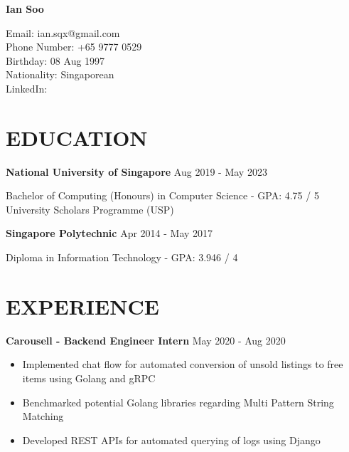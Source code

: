 \documentclass[11pt]{article} %
\begin{document}

{\LARGE\bfseries Ian Soo} %

Email: ian.sqx@gmail.com\\
Phone Number: +65 9777 0529\\
Birthday: 08 Aug 1997\\
Nationality: Singaporean\\
LinkedIn: \href{https://www.linkedin.com/in/sooian/}{\color{black}{https://www.linkedin.com/in/sooian/}}


\section*{EDUCATION}

\textbf{National University of Singapore} \hfill Aug 2019 - May 2023

Bachelor of Computing (Honours) in Computer Science - GPA: 4.75 / 5\\
University Scholars Programme (USP)

\medskip

\textbf{Singapore Polytechnic} \hfill Apr 2014 - May 2017

Diploma in Information Technology - GPA: 3.946 / 4


\section*{EXPERIENCE}

\textbf{Carousell - Backend Engineer Intern} \hfill May 2020 - Aug 2020

\smallskip
\begin{itemize}

    \item Implemented chat flow for automated conversion of unsold listings to free items using Golang and gRPC
    \item Benchmarked potential Golang libraries regarding Multi Pattern String Matching
    \item Developed REST APIs for automated querying of logs using Django

\end{itemize}
\end{document}
